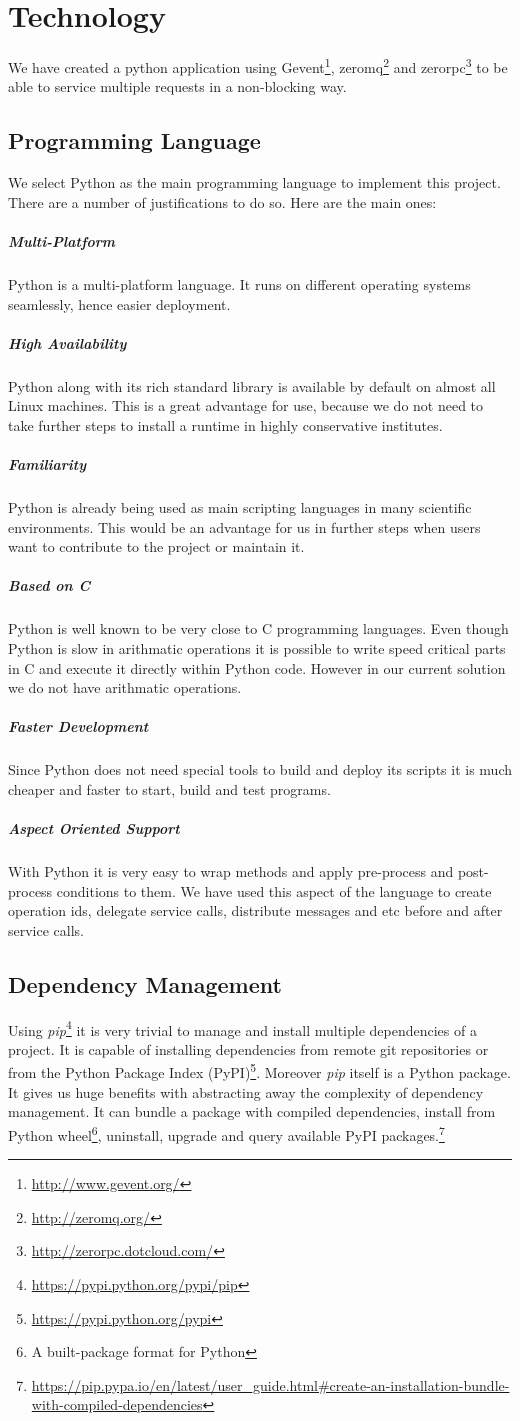 \section{Technology}
We have created a python application using Gevent\footnote{\url{http://www.gevent.org/}},
zeromq\footnote{\url{http://zeromq.org/}} and zerorpc\footnote{\url{http://zerorpc.dotcloud.com/}} 
to be able to service multiple requests in a non-blocking way.

\subsection{Programming Language}
We select Python as the main programming language to implement this project. There are a number of 
justifications to do so. Here are the main ones:

\subparagraph{Multi-Platform} Python is a multi-platform language. It runs on different operating systems
seamlessly, hence easier deployment.
\subparagraph{High Availability} Python along with its rich standard library is available by default on almost all Linux machines. This
is a great advantage for use, because we do not need to take further steps to install a runtime in highly conservative institutes.
\subparagraph{Familiarity} Python is already being used as main scripting languages in many scientific environments. This would be an advantage
for us in further steps when users want to contribute to the project or maintain it.
\subparagraph{Based on C} Python is well known to be very close to C programming languages. Even though Python is slow in arithmatic operations
it is possible to write speed critical parts in C and execute it directly within Python code. However in our current solution we do not have
arithmatic operations.
\subparagraph{Faster Development} Since Python does not need special tools to build and deploy its scripts it is much cheaper and faster
to start, build and test programs.
\subparagraph{Aspect Oriented Support} With Python it is very easy to wrap methods and apply pre-process and post-process conditions to them. We have
used this aspect of the language to create operation ids, delegate service calls, distribute messages and etc before and after service calls.

\subsection{Dependency Management} Using \textit{pip}\footnote{\url{https://pypi.python.org/pypi/pip}}
it is very trivial to manage and install multiple
dependencies of a project. It is capable of installing dependencies from remote git repositories or from 
the Python Package Index (PyPI)\footnote{\url{https://pypi.python.org/pypi}}. Moreover \textit{pip} itself is
a Python package. It gives us huge benefits with abstracting away the complexity of dependency management. It can
bundle a package with compiled dependencies, install from Python wheel\footnote{A built-package format for Python}, uninstall,
upgrade and query available PyPI packages.\footnote{\url{https://pip.pypa.io/en/latest/user_guide.html#create-an-installation-bundle-with-compiled-dependencies}}

